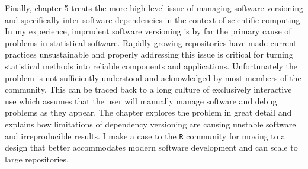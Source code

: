 Finally, chapter 5 treats the more high level issue of managing software versioning and specifically inter-software dependencies in the context of scientific computing. In my experience, imprudent software versioning is by far the primary cause of problems in statistical software. Rapidly growing repositories have made current practices unsustainable and properly addressing this issue is critical for turning statistical methods into reliable components and applications. Unfortunately the problem is not sufficiently understood and acknowledged by most members of the community. This can be traced back to a long culture of exclusively interactive use which assumes that the user will manually manage software and debug problems as they appear. The chapter explores the problem in great detail and explains how limitations of dependency versioning are causing unstable software and irreproducible results. I make a case to the \texttt{R} community for moving to a design that better accommodates modern software development and can scale to large repositories.  





